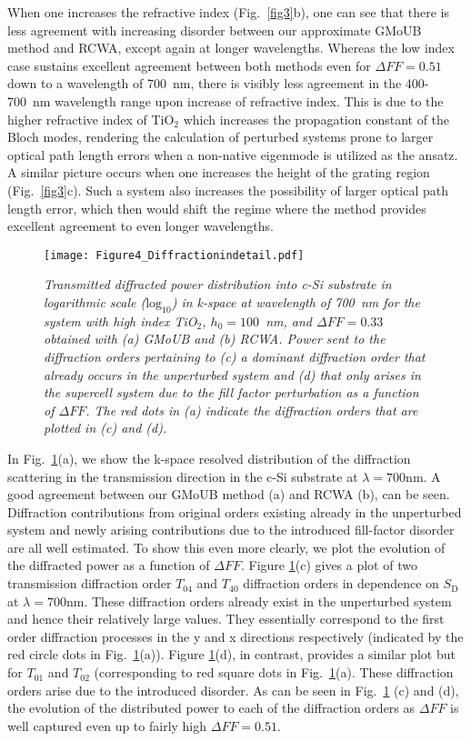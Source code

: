 \documentclass[ floatfix,reprint,amsmath,amssymb,aps,prb]{revtex4-1}
\begin{document}
When one increases the refractive index (Fig.~\ref{fig3}b), one can see that there is less agreement with increasing disorder between our approximate GMoUB method and RCWA, except again at longer wavelengths. Whereas the low index case sustains excellent agreement between both methods even for $\Delta FF=0.51$ down to a wavelength of 700~nm, there is visibly less agreement in the  400-700~nm wavelength range upon increase of refractive index. This is due to the higher refractive index of TiO$_2$ which increases the propagation constant of the Bloch modes, rendering the calculation of perturbed systems prone to larger optical path length errors when a non-native eigenmode is utilized as the ansatz. A similar picture occurs when one increases the height of the grating region (Fig.~\ref{fig3}c). Such a system also increases the possibility of larger optical path length error, which then would shift the regime where the method provides excellent agreement to even longer wavelengths. 

\begin{figure}[ht]

	\texttt{[image: Figure4\_Diffractionindetail.pdf]}
	\caption{\textit{Transmitted diffracted power  distribution into c-Si substrate in logarithmic scale ($\mathrm{log}_{10}$) in k-space at wavelength of 700~nm for the system with high index TiO$_2$, $h_0=100$~nm, and $\Delta FF = 0.33$ obtained with (a) GMoUB and (b) RCWA. Power sent to the diffraction orders pertaining to (c) a dominant diffraction order that already occurs in the unperturbed system and (d) that only arises in the supercell system due to the fill factor perturbation as a function of $\Delta FF$. The red dots in (a) indicate the diffraction orders that are plotted in (c) and (d). }}\label{fig4}

\end{figure}

In Fig.~\ref{fig4}(a), we show the k-space resolved distribution of the diffraction scattering in the transmission direction in the c-Si substrate at $\lambda= 700$nm. A good agreement between our GMoUB method (a) and RCWA (b), can be seen. Diffraction contributions from original orders existing already in the unperturbed system and newly arising contributions due to the introduced fill-factor disorder are all well estimated. To show this even more clearly, we plot the evolution of the diffracted power as a function of  $\Delta FF$. Figure \ref{fig4}(c) gives a plot of two transmission diffraction order $T_{04}$ and $T_{40}$ diffraction orders in dependence on $S_{\mathrm{D}}$ at $\lambda= 700$nm. These diffraction orders already exist in the unperturbed system and hence their relatively large values. They essentially correspond to the first order diffraction processes in the y and x directions respectively (indicated by the red circle dots in Fig.~\ref{fig4}(a)). Figure \ref{fig4}(d), in contrast, provides a similar plot but for $T_{01}$ and $T_{02}$ (corresponding to red square dots in Fig.~\ref{fig4}(a). These diffraction orders arise due to the introduced disorder. As can be seen in Fig.~\ref{fig4} (c) and (d), the evolution of the distributed power to each of the diffraction orders as $\Delta FF$ is well captured even up to fairly high $\Delta FF = 0.51$.
\end{document}
